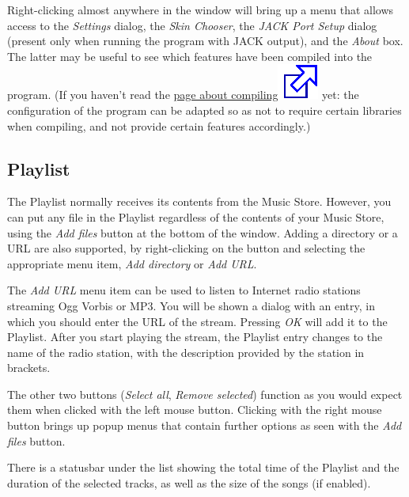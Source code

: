 \documentclass[10pt,english]{article}
\begin{document}
Right-clicking almost anywhere in the window will bring up
a menu that allows access to the \textsl{Settings} dialog,
the \textsl{Skin Chooser}, the \textsl{JACK Port Setup}
dialog (present only when running the program with JACK
output), and the \textsl{About} box. The latter may be
useful to see which features have been compiled into the
program. (If you haven't read the \href{http://aqualung.factorial.hu/compiling.html}{page about
compiling\includegraphics[scale=0.5]{external.eps}} yet: the configuration of the program can be
adapted so as not to require certain libraries when compiling,
and not provide certain features accordingly.)





\subsection{Playlist\label{idp489344}}



\noindent The Playlist normally receives its contents from the Music
Store. However, you can put any file in the Playlist
regardless of the contents of your Music Store, using the
\textsl{Add files} button at the bottom of the
window. Adding a directory or a URL are also supported, by
right-clicking on the button and selecting the appropriate
menu item, \textsl{Add directory} or \textsl{Add URL}.




The \textsl{Add URL} menu item can be used to listen to
Internet radio stations streaming Ogg Vorbis or MP3. You will
be shown a dialog with an entry, in which you should enter the
URL of the stream. Pressing \textsl{OK} will add it to the
Playlist. After you start playing the stream, the Playlist
entry changes to the name of the radio station, with the
description provided by the station in brackets.




The other two buttons (\textsl{Select all}, \textsl{Remove
selected}) function as you would expect them when clicked
with the left mouse button. Clicking with the right mouse
button brings up popup menus that contain further options as
seen with the \textsl{Add files} button.




There is a statusbar under the list showing the total time
of the Playlist and the duration of the selected tracks, as
well as the size of the songs (if enabled).
\end{document}
